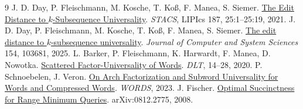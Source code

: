 \documentclass[UTF8,11pt,a4paper,fontset=fandol]{ctexart}
\theoremstyle{zh}
\begin{document}
\small
\begin{thebibliography}{9}\setlength{\itemsep}{.18em}
 J. D. Day, P. Fleischmann, M. Kosche, T. Koß, F. Manea, S. Siemer.
\href{https://doi.org/10.4230/LIPIcs.STACS.2021.25}{The Edit Distance to $k$-Subsequence Universality}.
\emph{STACS}, LIPIcs 187, 25:1--25:19, 2021.
 J. D. Day, P. Fleischmann, M. Kosche, T. Koß, F. Manea, S. Siemer.
\href{https://doi.org/10.1016/j.jcss.2025.103681}{The edit distance to $k$-subsequence universality}.
\emph{Journal of Computer and System Sciences} 154, 103681, 2025.
 L. Barker, P. Fleischmann, K. Harwardt, F. Manea, D. Nowotka.
\href{https://arxiv.org/abs/2003.04629}{Scattered Factor-Universality of Words}. \emph{DLT}, 14--28, 2020.
 P. Schnoebelen, J. Veron.
\href{https://arxiv.org/abs/2304.11932}{On Arch Factorization and Subword Universality for Words and Compressed Words}. \emph{WORDS}, 2023.
 J. Fischer.
\href{https://arxiv.org/abs/0812.2775}{Optimal Succinctness for Range Minimum Queries}. arXiv:0812.2775, 2008.
\end{thebibliography}
\end{document}
